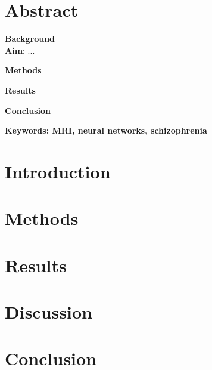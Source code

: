 



\maketitle

\section{Abstract}

\textbf{Background}\\
\lipsum[1]
\textbf{Aim}: ...

\textbf{Methods}\\
\lipsum[1]

\textbf{Results}\\
\lipsum[1]

\textbf{Conclusion}\\
\lipsum[1]

\textbf{Keywords: MRI, neural networks, schizophrenia}

\section{Introduction}

\lipsum[1-2]

\section{Methods}

\lipsum[3-4]

\section{Results}

\lipsum[5-6]

\section{Discussion}

\lipsum[7-8]

\section{Conclusion}

\lipsum[9-10]



